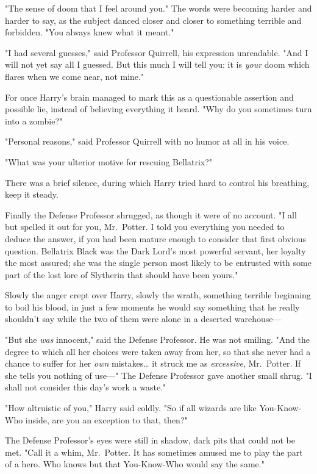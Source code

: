 "The sense of doom that I feel around you." The words were becoming harder and 
harder to say, as the subject danced closer and closer to something terrible 
and forbidden. "You always knew what it meant."

"I had several guesses," said Professor Quirrell, his expression unreadable. 
"And I will not yet say all I guessed. But this much I will tell you: it is 
\emph{your} doom which flares when we come near, not mine."

For once Harry's brain managed to mark this as a questionable assertion and 
possible lie, instead of believing everything it heard. "Why do you sometimes 
turn into a zombie?"

"Personal reasons," said Professor Quirrell with no humor at all in his voice.

"What was your ulterior motive for rescuing Bellatrix?"

There was a brief silence, during which Harry tried hard to control his 
breathing, keep it steady.

Finally the Defense Professor shrugged, as though it were of no account. "I all 
but spelled it out for you, Mr.~Potter. I told you everything you needed to 
deduce the answer, if you had been mature enough to consider that first obvious 
question. Bellatrix Black was the Dark Lord's most powerful servant, her 
loyalty the most assured; she was the single person most likely to be entrusted 
with some part of the lost lore of Slytherin that should have been yours."

Slowly the anger crept over Harry, slowly the wrath, something terrible 
beginning to boil his blood, in just a few moments he would say something that 
he really shouldn't say while the two of them were alone in a deserted 
warehouse---

"But she \emph{was} innocent," said the Defense Professor. He was not smiling. 
"And the degree to which all her choices were taken away from her, so that she 
never had a chance to suffer for her \emph{own} mistakes{\ldots} it struck me 
as \emph{excessive}, Mr.~Potter. If she tells you nothing of use---" The 
Defense Professor gave another small shrug. "I shall not consider this day's 
work a waste."

"How altruistic of you," Harry said coldly. "So if all wizards are like 
You-Know-Who inside, are you an exception to that, then?"

The Defense Professor's eyes were still in shadow, dark pits that could not be 
met. "Call it a whim, Mr.~Potter. It has sometimes amused me to play the part 
of a hero. Who knows but that You-Know-Who would say the same."

